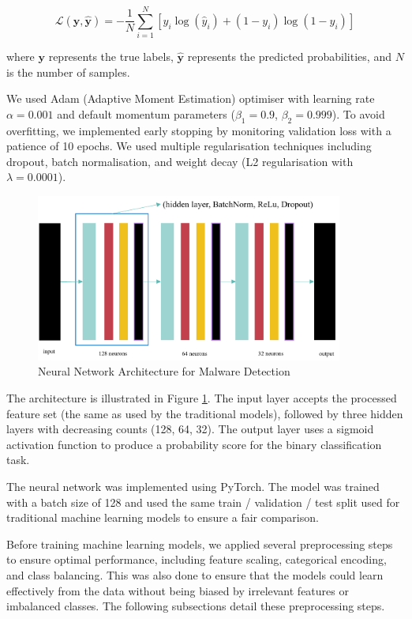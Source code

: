 \begin{equation}
\mathcal{L}(\mathbf{y}, \hat{\mathbf{y}}) = -\frac{1}{N}\sum_{i=1}^{N} [y_i \log(\hat{y}_i) + (1-y_i)\log(1-\hat{y}_i)]
\end{equation}

where $\mathbf{y}$ represents the true labels, $\hat{\mathbf{y}}$ represents the predicted probabilities, and $N$ is the number of samples.

We used Adam (Adaptive Moment Estimation) optimiser with learning rate $\alpha = 0.001$ and default momentum parameters ($\beta_1 = 0.9$, $\beta_2 = 0.999$). To avoid overfitting, we implemented early stopping by monitoring validation loss with a patience of 10 epochs. We used multiple regularisation techniques including dropout, batch normalisation, and weight decay (L2 regularisation with $\lambda = 0.0001$).

\begin{figure}[h!]
    \centering
    \includegraphics[width=0.9\textwidth]{images/architecture.png}
    \caption{Neural Network Architecture for Malware Detection}
    \label{fig:nn_architecture}
\end{figure}

The architecture is illustrated in Figure \ref{fig:nn_architecture}. The input layer accepts the processed feature set (the same as used by the traditional models), followed by three hidden layers with decreasing counts (128, 64, 32). The output layer uses a sigmoid activation function to produce a probability score for the binary classification task.

The neural network was implemented using PyTorch. The model was trained with a batch size of 128 and used the same train / validation / test split used for traditional machine learning models to ensure a fair comparison.

Before training machine learning models, we applied several preprocessing steps to ensure optimal performance, including feature scaling, categorical encoding, and class balancing. This was also done to ensure that the models could learn effectively from the data without being biased by irrelevant features or imbalanced classes. The following subsections detail these preprocessing steps.

